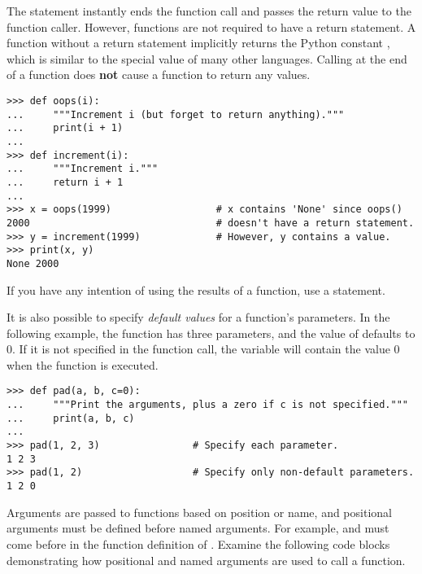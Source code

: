 \begin{warn} %
The  statement instantly ends the function call and passes the return value to the function caller.
However, functions are not required to have a return statement.
A function without a return statement implicitly returns the Python constant , which is similar to the special value  of many other languages.
Calling  at the end of a function does \textbf{not} cause a function to return any values.

\begin{lstlisting}
>>> def oops(i):
...     """Increment i (but forget to return anything)."""
...     print(i + 1)
...
>>> def increment(i):
...     """Increment i."""
...     return i + 1
...
>>> x = oops(1999)                  # x contains 'None' since oops()
2000                                # doesn't have a return statement.
>>> y = increment(1999)             # However, y contains a value.
>>> print(x, y)
None 2000
\end{lstlisting}
%
If you have any intention of using the results of a function, use a  statement.
\end{warn}

It is also possible to specify \emph{default values} for a function's parameters.
In the following example, the function  has three parameters, and the value of  defaults to 0.
If it is not specified in the function call, the variable  will contain the value 0 when the function is executed.

\begin{lstlisting}
>>> def pad(a, b, c=0):
...     """Print the arguments, plus a zero if c is not specified."""
...     print(a, b, c)
...
>>> pad(1, 2, 3)                # Specify each parameter.
1 2 3
>>> pad(1, 2)                   # Specify only non-default parameters.
1 2 0
\end{lstlisting}

Arguments are passed to functions based on position or name, and positional arguments must be defined before named arguments.
For example,  and  must come before  in the function definition of .
Examine the following code blocks demonstrating how positional and named arguments are used to call a function.

